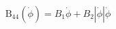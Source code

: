 \begin{equation} \label{eq:b44_quadratic_equation}
\operatorname{B_{44}}\left(\dot{\phi}\right) = B_{1} \dot{\phi} + B_{2} \left|{\dot{\phi}}\right| \dot{\phi}
\end{equation}
